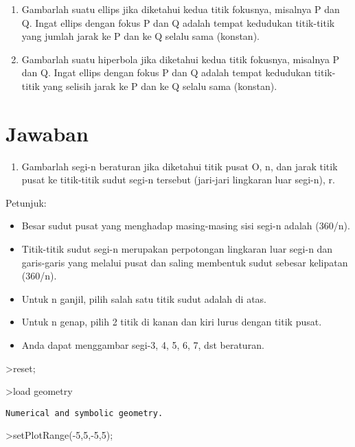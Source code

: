 \documentclass[
]{book}
\providecommand{\tightlist}{%
  \setlength{\itemsep}{0pt}\setlength{\parskip}{0pt}}
\begin{document}
\begin{enumerate}
\def\labelenumi{\arabic{enumi}.}
\setcounter{enumi}{3}
\item
  Gambarlah suatu ellips jika diketahui kedua titik fokusnya, misalnya P dan Q. Ingat ellips dengan fokus P dan Q adalah tempat kedudukan titik-titik yang jumlah jarak ke P dan ke Q selalu sama (konstan).
\item
  Gambarlah suatu hiperbola jika diketahui kedua titik fokusnya, misalnya P dan Q. Ingat ellips dengan fokus P dan Q adalah tempat kedudukan titik-titik yang selisih jarak ke P dan ke Q selalu sama (konstan).
\end{enumerate}

\chapter{Jawaban}\label{jawaban-1}

\begin{enumerate}
\def\labelenumi{\arabic{enumi}.}
\tightlist
\item
  Gambarlah segi-n beraturan jika diketahui titik pusat O, n, dan jarak titik pusat ke titik-titik sudut segi-n tersebut (jari-jari lingkaran luar segi-n), r.
\end{enumerate}

Petunjuk:

\begin{itemize}
\tightlist
\item
  Besar sudut pusat yang menghadap masing-masing sisi segi-n adalah (360/n).
\item
  Titik-titik sudut segi-n merupakan perpotongan lingkaran luar segi-n dan garis-garis yang melalui pusat dan saling membentuk sudut sebesar kelipatan (360/n).
\item
  Untuk n ganjil, pilih salah satu titik sudut adalah di atas.
\item
  Untuk n genap, pilih 2 titik di kanan dan kiri lurus dengan titik pusat.
\item
  Anda dapat menggambar segi-3, 4, 5, 6, 7, dst beraturan.
\end{itemize}

\textgreater reset;

\textgreater load geometry

\begin{verbatim}
Numerical and symbolic geometry.
\end{verbatim}

\textgreater setPlotRange(-5,5,-5,5);
\end{document}
